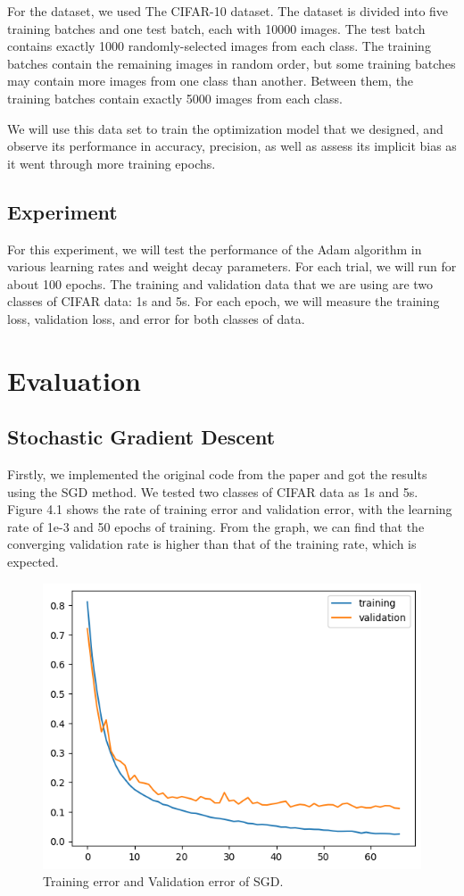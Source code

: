 For the dataset, we used The CIFAR-10 dataset. The dataset is divided into five training batches and one test batch, each with 10000 images. The test batch contains exactly 1000 randomly-selected images from each class. The training batches contain the remaining images in random order, but some training batches may contain more images from one class than another. Between them, the training batches contain exactly 5000 images from each class.

We will use this data set to train the optimization model that we designed, and observe its performance in accuracy, precision, as well as assess its implicit bias as it went through more training epochs.

\section{Experiment}

For this experiment, we will test the performance of the Adam algorithm in various learning rates and weight decay parameters. For each trial, we will run for about 100 epochs. The training and validation data that we are using are two classes of CIFAR data: 1s and 5s. For each epoch, we will measure the training loss, validation loss, and error for both classes of data.

\chapter{Evaluation}
\section{Stochastic Gradient Descent}
Firstly, we implemented the original code from the paper and got the results using the SGD method. We tested two classes of CIFAR data as 1s and 5s. Figure 4.1 shows the rate of training error and validation error, with the learning rate of 1e-3 and 50 epochs of training. From the graph, we can find that the converging validation rate is higher than that of the training rate, which is expected.

\begin{figure}[H]
    \centering %
        \includegraphics[width=0.6\linewidth]{./SGD.png} 
    \caption{Training error and Validation error of SGD.}
\end{figure}

